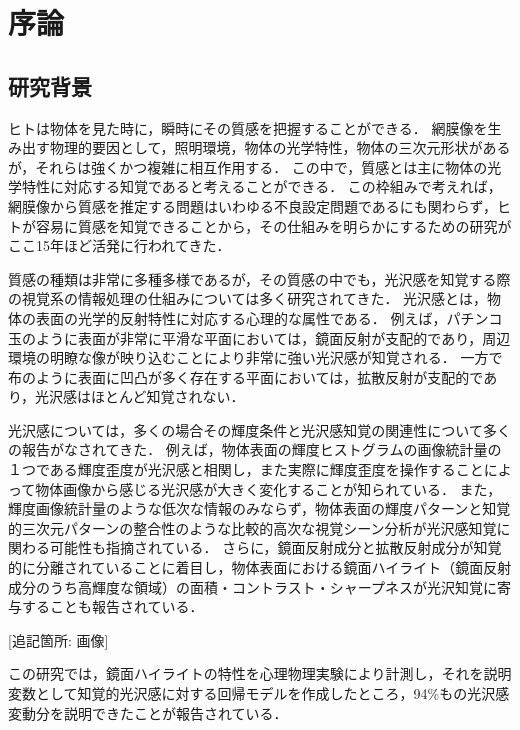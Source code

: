 \chapter{序論}
    \section{研究背景}
        ヒトは物体を見た時に，瞬時にその質感を把握することができる．
        網膜像を生み出す物理的要因として，照明環境，物体の光学特性，物体の三次元形状があるが，それらは強くかつ複雑に相互作用する．
        この中で，質感とは主に物体の光学特性に対応する知覚であると考えることができる．
        この枠組みで考えれば，網膜像から質感を推定する問題はいわゆる不良設定問題であるにも関わらず，ヒトが容易に質感を知覚できることから，その仕組みを明らかにするための研究がここ15年ほど活発に行われてきた．

        質感の種類は非常に多種多様であるが\cite{Material}，その質感の中でも，光沢感を知覚する際の視覚系の情報処理の仕組みについては多く研究されてきた．
        光沢感とは，物体の表面の光学的反射特性に対応する心理的な属性である．
        例えば，パチンコ玉のように表面が非常に平滑な平面においては，鏡面反射が支配的であり，周辺環境の明瞭な像が映り込むことにより非常に強い光沢感が知覚される．
        一方で布のように表面に凹凸が多く存在する平面においては，拡散反射が支配的であり，光沢感はほとんど知覚されない．

        光沢感については，多くの場合その輝度条件と光沢感知覚の関連性について多くの報告がなされてきた．
        例えば，物体表面の輝度ヒストグラムの画像統計量の１つである輝度歪度が光沢感と相関し，また実際に輝度歪度を操作することによって物体画像から感じる光沢感が大きく変化することが知られている\cite{Motoyoshi}．
        また，輝度画像統計量のような低次な情報のみならず，物体表面の輝度パターンと知覚的三次元パターンの整合性のような比較的高次な視覚シーン分析が光沢感知覚に関わる可能性も指摘されている\cite{Marlow1}．
        さらに，鏡面反射成分と拡散反射成分が知覚的に分離されていることに着目し，物体表面における鏡面ハイライト（鏡面反射成分のうち高輝度な領域）の面積・コントラスト・シャープネスが光沢知覚に寄与することも報告されている\cite{Marlow2}．
        
        [追記箇所: 画像]
        
        この研究では，鏡面ハイライトの特性を心理物理実験により計測し，それを説明変数として知覚的光沢感に対する回帰モデルを作成したところ，94\%もの光沢感変動分を説明できたことが報告されている．

